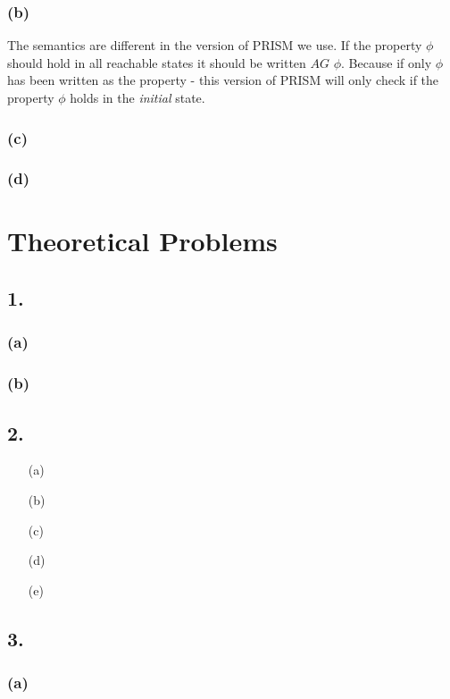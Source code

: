 \documentclass[12pt]{report}
\begin{document}
\subsubsection*{(b)}
The semantics are different in the version of PRISM we use. If the property $\phi$ should hold in all reachable states it should be written $AG$ $\phi$. Because if only $\phi$ has been written as the property - this version of PRISM will only check if the property $\phi$ holds in the \emph{initial} state.
\subsubsection*{(c)}

\subsubsection*{(d)}

\section*{Theoretical Problems}
\subsection*{1.}
\subsubsection*{(a)}

\subsubsection*{(b)}

\subsection*{2.}
\begin{itemize}
\item[(a)]
\item[(b)]
\item[(c)]
\item[(d)]
\item[(e)]
\end{itemize}

\subsection*{3.}
\subsubsection*{(a)}
\end{document}
